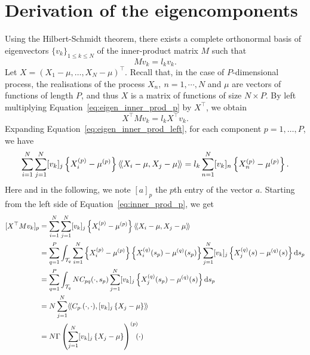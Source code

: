\section{Derivation of the eigencomponents} %
\label{sec:derivation_of_the_eigencomponents}

Using the Hilbert-Schmidt theorem, there exists a complete orthonormal basis of eigenvectors $\{v_k\}_{1 \leq k \leq N}$ of the inner-product matrix $M$ such that
\begin{equation}\label{eq:eigen_inner_prod_p}
    Mv_k = l_kv_k.
\end{equation}
Let $X = \left(X_1 - \mu, \dots, X_N - \mu\right)^\top$. Recall that, in the case of $P$-dimensional process, the realisations of the process $X_n,~n = 1, \cdots, N$ and $\mu$ are vectors of functions of length $P$, and thus $X$ is a matrix of functions of size $N \times P$. By left multiplying Equation~\eqref{eq:eigen_inner_prod_p} by $X^\top$, we obtain
\begin{equation}\label{eq:eigen_inner_prod_left}
    X^\top M v_k = l_k X^\top v_k.
\end{equation} 
Expanding Equation~\eqref{eq:eigen_inner_prod_left}, for each component $p = 1, \dots, P$, we have
\begin{equation}\label{eq:inner_prod_p}
    \sum_{i = 1}^N \sum_{j = 1}^N [v_{k}]_j\left\{X_i^{(p)} - \mu^{(p)}\right\}\langle\!\langle X_i - \mu, X_j - \mu\rangle\!\rangle = l_k \sum_{n = 1}^N [v_{k}]_n\left\{X_n^{(p)} - \mu^{(p)}\right\}.
\end{equation}
Here and in the following, we note $[a]_p$ the $p$th entry of the vector $a$. Starting from the left side of Equation~\eqref{eq:inner_prod_p}, we get
\begin{align}\label{eq:inner_prod_p_left}
[X^\top M v_k]_p &= \sum_{i = 1}^N \sum_{j = 1}^N [v_{k}]_j \left\{X_i^{(p)} - \mu^{(p)}\right\}\langle\!\langle X_i - \mu, X_j - \mu\rangle\!\rangle\\
&= \sum_{q = 1}^P \int_{\mathcal{T}_{q}} \sum_{i = 1}^N \left\{X_i^{(p)} - \mu^{(p)}\right\} \left\{X_i^{(q)}(s_p) - \mu^{(q)}(s_p)\right\} \sum_{j = 1}^N [v_{k}]_j \left\{X_j^{(q)}(s) - \mu^{(q)}(s)\right\} {\rm d} s_p \\
&= \sum_{q = 1}^P \int_{\mathcal{T}_{q}} N C_{pq}(\cdot, s_p)\sum_{j = 1}^N [v_{k}]_j \left\{X_j^{(q)}(s_p) - \mu^{(q)}(s)\right\} {\rm d} s_p \\
&= N \sum_{j = 1}^N \langle\!\langle C_{p \cdot}(\cdot, \cdot), [v_{k}]_j \left\{X_j - \mu\right\}\rangle\!\rangle \\
&= N \Gamma\left(\sum_{j = 1}^N [v_{k}]_j \left\{X_j - \mu\right\} \right)^{(p)}\mkern-9mu(\cdot)
\end{align}
